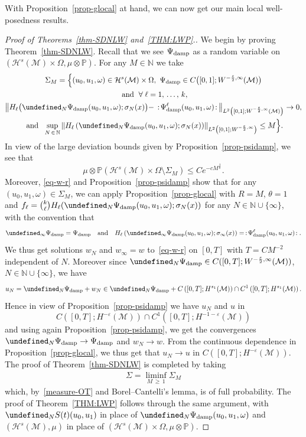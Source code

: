 \documentclass[10pt]{amsart}
\theoremstyle{definition}\newtheorem{defi}[theo]{Definition}\newtheorem{rema}[theo]{Remark}\newtheorem{exam}[theo]{Example}\newtheorem{exem}[theo]{Example}\newtheorem{nota}[theo]{Notation}
\newcommand{\damp}{\textup{damp}}
\newcommand{\Prob}{\mathbb{P}}
\newcommand{\N}{\mathbb{N}}
\let\P= \undefined
\newcommand{\P}{\mathbf{P}}
\newcommand{\M}{\mathcal{M}}
\renewcommand{\H}{\mathcal{H}}
\newcommand{\eps}{\varepsilon}
\newcommand{\s}{\sigma}
\newcommand{\Si}{\Sigma}
\renewcommand{\o}{\omega}
\renewcommand{\O}{\Omega}
\let\oldforall\forall
\renewcommand*{\forall}{\mathrel{\oldforall}}
\begin{document}
With Proposition~\ref{prop-glocal} at hand, we can now get our main local well-posedness results.
\begin{proof}[Proof of Theorems~\ref{thm-SDNLW} and~\ref{THM:LWP}.]
We begin by proving Theorem~\ref{thm-SDNLW}. Recall that we see $\Psi_{\damp}$ as a random variable on $(\H^s(\M)\times\O,\mu\otimes\Prob)$. For any $M\in\N$ we take
\begin{multline*}
\Si_{M} = \Big\{(u_0,u_1,\o)\in\H^s(\M)\times\O,~\Psi_{\damp}\in C\big([0,1];W^{-\frac\eps2,\infty}(\M)\big) \\
\text{ and }\forall \ell=1,\,\dots,\,k,\\
\left\|H_{\ell}\big(\P_N\Psi_\damp(u_0,u_1,\o);\s_N(x)\big) - \,:\!\Psi_{\damp}^{\ell}(u_0,u_1,\o)\!:\,\right\|_{L^2\left([0,1];W^{-\frac{\eps}2,\infty}(\M)\right)}\to 0,\\
\text{ and }~\sup_{N\,\in\,\N}\left\|H_{\ell}\left(\P_N\Psi_\damp(u_0,u_1,\o);\s_N(x)\right)\right\|_{L^{2}\left([0,1];W^{-\frac\eps2,\infty}\right)}\leq M\Big\}.
\end{multline*}
In view of the large deviation bounds given by Proposition~\ref{prop-psidamp}, we see that
\begin{equation}\label{measure-OT}
\mu\otimes\Prob\left(\H^s(\M)\times\O\setminus \Si_{M}\right)\leq Ce^{-cM^{\frac2k}}.
\end{equation}
Moreover, \eqref{eq-w-r} and Proposition~\ref{prop-psidamp} show that for any $(u_0,u_1,\o)\in\Si_{M}$, we can apply Proposition~\ref{prop-glocal} with $R=M$, $\theta=1$ and $f_\ell = {\binom k \ell}H_{\ell}(\P_N\Psi_\damp(u_0,u_1,\o);\s_N(x))$ for any $N\in\N\cup\{\infty\}$, with the convention that 
\[
\P_{\infty}\Psi_{\damp} = \Psi_{\damp}\quad\text{and}\quad H_{\ell}\left(\P_\infty\Psi_\damp(u_0,u_1,\o);\s_\infty(x)\right) = \,:\!\Psi_\damp^\ell(u_0,u_1,\o)\!:.
\]
We thus get solutions $w_N$ and $w_{\infty}=w$ to~\eqref{eq-w-r} on $[0,T]$ with $T = CM^{-2}$ independent of $N$. Moreover since $\P_N\Psi_{\damp}\in C([0,T];W^{-\frac\eps2,\infty}(\M))$, $N\in\N\cup\{\infty\}$, we have
\begin{align*}
u_N=\P_N\Psi_{\damp}+w_N\in \P_N\Psi_{\damp} + C\left([0,T];H^{s_1}(\M)\right)\cap C^1\left([0,T];H^{s_1}(\M)\right).
\end{align*}
Hence in view of Proposition~\ref{prop-psidamp} we have $u_N$ and $u$ in 
\[
C\left([0,T];H^{-\eps}(\M)\right)\cap C^1\left([0,T];H^{-1-\eps}(\M)\right)
\]
and using again Proposition~\ref{prop-psidamp}, we get the convergences $\P_N\Psi_{\damp}\rightarrow \Psi_{\damp}$ and $w_N\rightarrow w$. From the continuous dependence in Proposition~\ref{prop-glocal}, we thus get that $u_N \rightarrow u$ in $C([0,T];H^{-\eps}(\M))$. The proof of Theorem~\ref{thm-SDNLW} is completed by taking
\begin{align*}
\Si =\liminf_{M\,\geq\,1} \Si_{M}
\end{align*}
which, by~\eqref{measure-OT} and Borel--Cantelli's lemma, is of full probability. The proof of Theorem~\ref{THM:LWP} follows through the same argument, with $\P_NS(t)(u_0,u_1)$ in place of $\P_N\Psi_{\damp}(u_0,u_1,\o)$ and $(\H^s(\M),\mu)$ in place of $(\H^s(\M)\times\O,\mu\otimes\Prob)$.
\end{proof}
\end{document}
